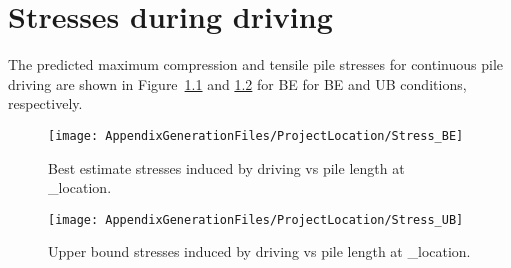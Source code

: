\chapter{Stresses during driving}\label{sec_1}
The predicted maximum compression and tensile pile stresses for continuous
pile driving are shown in Figure~\ref{stress_BE} and \ref{stress_UB} for BE for BE and UB conditions,
respectively. 




\begin{figure}[H]
\texttt{[image: AppendixGenerationFiles/ProjectLocation/Stress\_BE]}
\caption{Best estimate stresses induced by driving vs pile length at {\ID_location}.}
\label{stress_BE}
\end{figure}
\vspace{-0.5cm}
\newpage
\begin{figure}[H]
\texttt{[image: AppendixGenerationFiles/ProjectLocation/Stress\_UB]}
\caption{Upper bound stresses induced by driving vs pile length at {\ID_location}.}
\label{stress_UB}
\end{figure}

